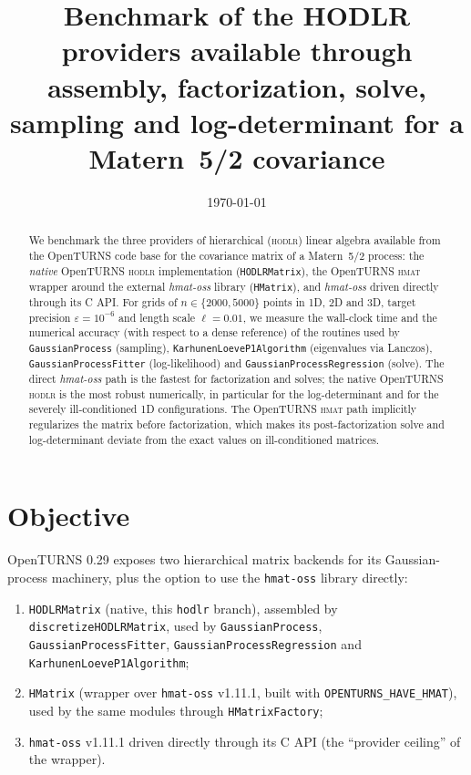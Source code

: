 \documentclass[11pt]{article}
\title{Benchmark of the HODLR providers available through \ot{}\\[2mm]
\large assembly, factorization, solve, sampling and log-determinant for a Matern~5/2 covariance}
\author{}
\date{\today}
\newcommand{\ot}{OpenTURNS}
\begin{document}
\sloppy

\maketitle

\begin{abstract}
We benchmark the three providers of hierarchical (\textsc{hodlr}) linear algebra
available from the \ot{} code base for the covariance matrix of a Matern~5/2
process: the \emph{native} \ot{} \textsc{hodlr} implementation
(\texttt{HODLRMatrix}), the \ot{} \textsc{hmat} wrapper around the external
\emph{hmat-oss} library (\texttt{HMatrix}), and \emph{hmat-oss} driven directly
through its C API.  For grids of $n \in \{2000, 5000\}$ points in 1D, 2D and 3D,
target precision $\varepsilon = 10^{-6}$ and length scale $\ell = 0.01$, we
measure the wall-clock time and the numerical accuracy (with respect to a dense
reference) of the routines used by \texttt{GaussianProcess} (sampling),
\texttt{KarhunenLoeveP1Algorithm} (eigenvalues via Lanczos),
\texttt{GaussianProcessFitter} (log-likelihood) and
\texttt{GaussianProcessRegression} (solve).  The direct \emph{hmat-oss} path is
the fastest for factorization and solves; the native \ot{}
\textsc{hodlr} is the most robust numerically, in particular for the
log-determinant and for the severely ill-conditioned 1D configurations.  The
\ot{} \textsc{hmat} path implicitly regularizes the matrix before
factorization, which makes its post-factorization solve and log-determinant
deviate from the exact values on ill-conditioned matrices.
\end{abstract}

\section{Objective}\label{sec:objective}

OpenTURNS 0.29 exposes two hierarchical matrix backends for its Gaussian-process
machinery, plus the option to use the \texttt{hmat-oss} library directly:

\begin{enumerate}
  \item \texttt{HODLRMatrix} (native, this \texttt{hodlr} branch), assembled by
        \texttt{discretizeHODLRMatrix}, used by \texttt{GaussianProcess},
        \texttt{GaussianProcessFitter}, \texttt{GaussianProcessRegression} and
        \texttt{KarhunenLoeveP1Algorithm};
  \item \texttt{HMatrix} (wrapper over \texttt{hmat-oss} v1.11.1, built with
        \texttt{OPENTURNS\_HAVE\_HMAT}), used by the same modules through
        \texttt{HMatrixFactory};
  \item \texttt{hmat-oss} v1.11.1 driven directly through its C API (the
        ``provider ceiling'' of the wrapper).
\end{enumerate}
\end{document}
